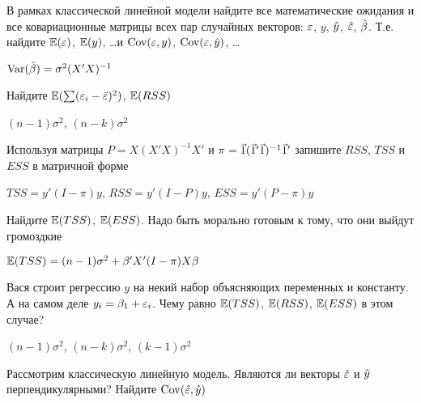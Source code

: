 \begin{problem}
В рамках классической линейной модели найдите все математические ожидания и все ковариационные матрицы всех пар случайных векторов: $\varepsilon$, $y$, $\hat{y}$, $\hat{\varepsilon}$, $\hat{\beta}$. Т.е. найдите $\mathbb{E}(\varepsilon)$, $\mathbb{E}(y)$, \ldots и $\operatorname{Cov}(\varepsilon,y)$, $\operatorname{Cov}(\varepsilon,\hat{y})$, \ldots
\end{problem}

\begin{solution}
$\operatorname{Var}(\hat{\beta})=\sigma^2 (X'X)^{-1}$
\end{solution}


\begin{problem}
Найдите $\mathbb{E}(\sum (\varepsilon_i-\bar{\varepsilon})^2 )$, $\mathbb{E}(RSS)$
\end{problem}

\begin{solution}
$(n-1)\sigma^2$, $(n-k)\sigma^2$
\end{solution}


\begin{problem}
Используя матрицы $P=X(X'X)^{-1}X'$ и $\pi=\v1(\v1'\v1)^{-1}\v1'$ запишите $RSS$, $TSS$ и $ESS$ в матричной форме
\end{problem}
\begin{solution}
$TSS=y'(I-\pi)y$, $RSS=y'(I-P)y$, $ESS=y'(P-\pi)y$ 
\end{solution}



\begin{problem}
Найдите $\mathbb{E}(TSS)$, $\mathbb{E}(ESS)$. Надо быть морально готовым к тому, что они выйдут громоздкие 
\end{problem}
\begin{solution}
$\mathbb{E}(TSS)=(n-1)\sigma^2+\beta'X'(I-\pi)X\beta$
\end{solution}


\begin{problem}
Вася строит регрессию $y$ на некий набор объясняющих переменных и константу. А на самом деле $y_i=\beta_1+\varepsilon_i$. Чему равно $\mathbb{E}(TSS)$, $\mathbb{E}(RSS)$, $\mathbb{E}(ESS)$ в этом случае?
\end{problem}

\begin{solution}
$(n-1)\sigma^2$, $(n-k)\sigma^2$, $(k-1)\sigma^2$
\end{solution}



\begin{problem}
Рассмотрим классическую линейную модель. Являются ли векторы $\hat{\varepsilon}$ и $\hat{y}$ перпендикулярными? Найдите $\operatorname{Cov}(\hat{\varepsilon},\hat{y})$
\end{problem}
\begin{solution}
\end{solution}


